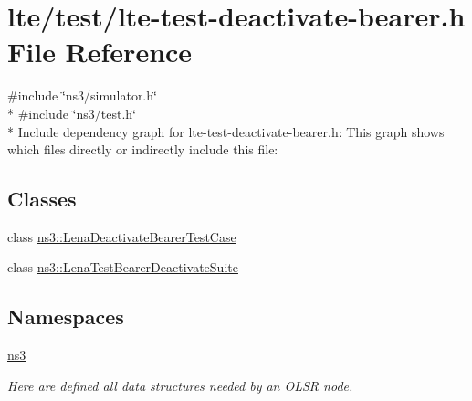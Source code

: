 \hypertarget{lte-test-deactivate-bearer_8h}{}\section{lte/test/lte-\/test-\/deactivate-\/bearer.h File Reference}
\label{lte-test-deactivate-bearer_8h}
{\ttfamily \#include \char`\"{}ns3/simulator.\+h\char`\"{}}\\*
{\ttfamily \#include \char`\"{}ns3/test.\+h\char`\"{}}\\*
Include dependency graph for lte-\/test-\/deactivate-\/bearer.h\+:
This graph shows which files directly or indirectly include this file\+:
\subsection*{Classes}
\begin{DoxyCompactItemize}
\item 
class \hyperlink{classns3_1_1LenaDeactivateBearerTestCase}{ns3\+::\+Lena\+Deactivate\+Bearer\+Test\+Case}
\item 
class \hyperlink{classns3_1_1LenaTestBearerDeactivateSuite}{ns3\+::\+Lena\+Test\+Bearer\+Deactivate\+Suite}
\end{DoxyCompactItemize}
\subsection*{Namespaces}
\begin{DoxyCompactItemize}
\item 
 \hyperlink{namespacens3}{ns3}
\begin{DoxyCompactList}\small\item\em Here are defined all data structures needed by an O\+L\+SR node. \end{DoxyCompactList}\end{DoxyCompactItemize}
